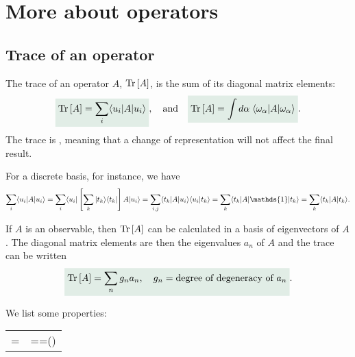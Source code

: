 \section{More about operators}

\subsection{Trace of an operator}
The trace of an operator $A$, $\text{Tr}\left[A\right]$, is the sum of its diagonal matrix elements:
\begin{align*}
    \highlight{\tr{A}=\sum_i\braket{u_i|A|u_i}},\quad\text{and}\quad\highlight{\tr{A}=\int d\alpha\;\braket{\omega_\alpha|A|\omega_\alpha}}.
\end{align*}
The trace is , meaning that a change of representation will not affect the final result.

For a discrete basis, for instance, we have
\begin{align*}
    \sum_i\braket{u_i|A|u_i}=\sum_i\bra{u_i}\left[\sum_k\ket{t_k}\bra{t_k}\right]A\ket{u_i}=\sum_{i,j}\braket{t_k|A|u_i}\braket{u_i|t_k}=\sum_k\bra{t_k|A}\mathds{1}\ket{t_k}=\sum_k\braket{t_k|A|t_k}.
\end{align*}
\begin{emphasizer}
    If $A$ is an observable, then $\text{Tr}\left[A\right]$ can be calculated in a basis of eigenvectors of $A$. The diagonal matrix elements are then the 
    eigenvalues $a_n$ of $A$ and the trace can be written
    \begin{align}
        \highlight{\tr{A}=\sum_ng_na_n,\quad g_n=\text{degree of degeneracy of $a_n$}}.
    \end{align}
\end{emphasizer}

We list some properties:
\begin{table}[htbp]
    \centering
    \begin{tabular}{L|L}
        =&==\;()
    \end{tabular}
\end{table}
